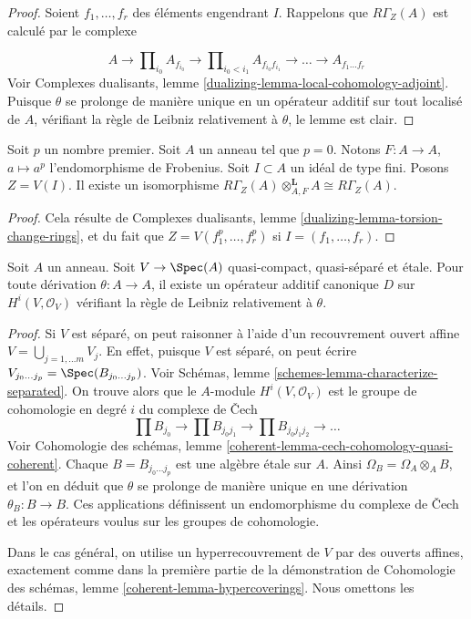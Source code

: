 \begin{proof}
Soient $f_1, \ldots, f_r$ des éléments engendrant $I$. Rappelons que $R\Gamma_Z(A)$ est calculé par le complexe

$$
A \to \prod\nolimits_{i_0} A_{f_{i_0}} \to
\prod\nolimits_{i_0 < i_1} A_{f_{i_0}f_{i_1}}
\to \ldots \to A_{f_1\ldots f_r}
$$
Voir Complexes dualisants, lemme \ref{dualizing-lemma-local-cohomology-adjoint}. Puisque $\theta$ se prolonge de manière unique en un opérateur additif sur tout localisé de $A$, vérifiant la règle de Leibniz relativement à $\theta$, le lemme est clair.
\end{proof}

\begin{lemma}
\label{lemma-frobenius}
Soit $p$ un nombre premier. Soit $A$ un anneau tel que $p = 0$. Notons $F : A \to A$, $a \mapsto a^p$ l'endomorphisme de Frobenius. Soit $I \subset A$ un idéal de type fini. Posons $Z = V(I)$. Il existe un isomorphisme $R\Gamma_Z(A) \otimes_{A, F}^\mathbf{L} A \cong R\Gamma_Z(A)$.
\end{lemma}

\begin{proof}
Cela résulte de Complexes dualisants, lemme \ref{dualizing-lemma-torsion-change-rings}, et du fait que $Z = V(f_1^p, \ldots, f_r^p)$ si $I = (f_1, \ldots, f_r)$.
\end{proof}

\begin{lemma}
\label{lemma-etale-derivation}
Soit $A$ un anneau. Soit $V \to \Spec(A)$ quasi-compact, quasi-séparé et \'etale. Pour toute dérivation $\theta : A \to A$, il existe un opérateur additif canonique $D$ sur $H^i(V, \mathcal{O}_V)$ vérifiant la règle de Leibniz relativement à $\theta$.
\end{lemma}

\begin{proof}
Si $V$ est séparé, on peut raisonner à l'aide d'un recouvrement ouvert affine $V = \bigcup_{j = 1, \ldots m} V_j$. En effet, puisque $V$ est séparé, on peut écrire $V_{j_0 \ldots j_p} = \Spec(B_{j_0 \ldots j_p})$. Voir Schémas, lemme \ref{schemes-lemma-characterize-separated}. On trouve alors que le $A$-module $H^i(V, \mathcal{O}_V)$ est le groupe de cohomologie en degré $i$ du complexe de {\v C}ech
$$
\prod B_{j_0} \to
\prod B_{j_0j_1} \to
\prod B_{j_0j_1j_2} \to \ldots
$$
Voir Cohomologie des schémas, lemme \ref{coherent-lemma-cech-cohomology-quasi-coherent}. Chaque $B = B_{j_0 \ldots j_p}$ est une algèbre \'etale sur $A$. Ainsi $\Omega_B = \Omega_A \otimes_A B$, et l'on en déduit que $\theta$ se prolonge de manière unique en une dérivation $\theta_B : B \to B$. Ces applications définissent un endomorphisme du complexe de {\v C}ech et les opérateurs voulus sur les groupes de cohomologie.

\medskip\noindent
Dans le cas général, on utilise un hyperrecouvrement de $V$ par des ouverts affines, exactement comme dans la première partie de la démonstration de Cohomologie des schémas, lemme \ref{coherent-lemma-hypercoverings}. Nous omettons les détails.
\end{proof}

